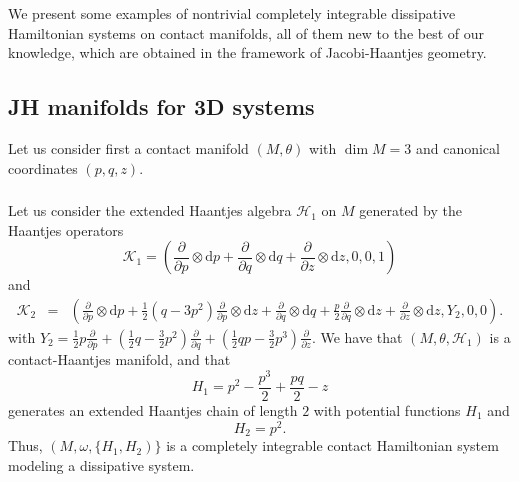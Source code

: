 \documentclass[10pt]{amsart}
\numberwithin{equation}{section}
\newcommand{\beq}{\begin{equation}}
\newcommand{\eeq}{\end{equation}}
\newcommand{\bea}{\begin{eqnarray}}
\newcommand{\eea}{\end{eqnarray}}
\newcommand{\nn}{\nonumber}
\newcommand{\rd}{\mathrm{d}}
\theoremstyle{definition}
\begin{document}
We present some examples of nontrivial completely integrable dissipative Hamiltonian systems on contact manifolds, all of them new to the best of our knowledge, which are obtained in the framework of Jacobi-Haantjes geometry.



\subsection{JH manifolds for 3D systems}
Let us consider first a contact manifold $(M,\theta)$ with $\dim M=3$ and canonical coordinates $(p,q,z)$.

\subsubsection{} Let us consider the extended Haantjes algebra $\mathscr{H}_{1}$ on $M$ generated by the Haantjes operators 
\beq \label{eq:K1}
\mathcal{K}_1= \left(\frac{\partial}{\partial p}\otimes \rd p+\frac{\partial}{\partial q}\otimes \rd q+\frac{\partial}{\partial z}\otimes \rd z,0,0,1\right)
\eeq
and
\bea \nn
\mathcal{K}_2&=& \left(\frac{\partial}{\partial p}\otimes \rd p+\frac{1}{2}(q-3p^2)\frac{\partial}{\partial p}\otimes \rd z+\frac{\partial}{\partial q}\otimes \rd q+ \frac{p}{2}\frac{\partial}{\partial q}\otimes \rd z+\frac{\partial}{\partial z}\otimes \rd z,Y_{2},0,0\right).
\eea
with $Y_{2}=\frac{1}{2}p\frac{\partial}{\partial p}+(\frac{1}{2}q-\frac{3}{2}p^{2})\frac{\partial}{\partial q}+(\frac{1}{2}qp-\frac{3}{2}p^{3})\frac{\partial}{\partial z}$. We have that $(M,\theta,\mathscr{H}_{1})$ is a contact-Haantjes manifold, and that \beq
H_1=p^2-\frac{p^3}{2}+\frac{p q}{2}-z
\eeq
generates an extended Haantjes chain of length $2$ with potential functions $H_{1}$ and
\beq
H_{2}=p^2.
\eeq
Thus, $(M,\omega, \{H_1,H_2)\}$ is a completely integrable contact Hamiltonian system modeling a dissipative system.
\vspace{2mm}
\end{document}
